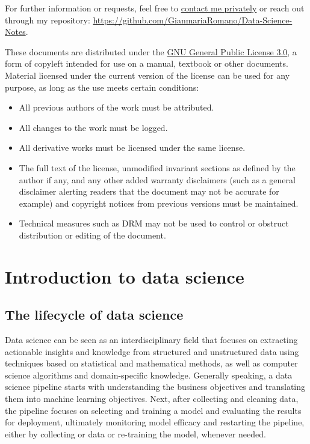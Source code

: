 \documentclass{report}
\begin{document}
\begin{tcolorbox}[colback=gray!5!white, colframe=gray!75!black, title=Contacts]
    For further information or requests, feel free to \href{https://t.me/toritosenso}{contact me privately} or reach out through my repository: \href{https://github.com/GianmariaRomano/Data-Science-Notes}{https://github.com/GianmariaRomano/Data-Science-Notes}.
\end{tcolorbox}

\begin{tcolorbox}[colback=gray!5!white, colframe=gray!75!black, title=License]
    These documents are distributed under the \href{https://www.gnu.org/licenses/gpl-3.0.en.html}{GNU General Public License 3.0}, a form of copyleft intended for use on a manual, textbook or other documents. Material licensed under the current version of the license can be used for any purpose, as long as the use meets certain conditions:
    \begin{itemize}
        \item All previous authors of the work must be attributed.
        \item All changes to the work must be logged.
        \item All derivative works must be licensed under the same license.
        \item The full text of the license, unmodified invariant sections as defined by the author if any, and any other added warranty disclaimers (such as a general disclaimer alerting readers that the document may not be accurate for example) and copyright notices from previous versions must be maintained.
        \item Technical measures such as DRM may not be used to control or obstruct distribution or editing of the document.
    \end{itemize}
\end{tcolorbox}

\tableofcontents

\chapter{Introduction to data science}
\section{The lifecycle of data science}
Data science can be seen as an interdisciplinary field that focuses on extracting actionable insights and knowledge from structured and unstructured data using techniques based on statistical and mathematical methods, as well as computer science algorithms and domain-specific knowledge. \newline
Generally speaking, a data science pipeline starts with understanding the business objectives and translating them into machine learning objectives. \newline
Next, after collecting and cleaning data, the pipeline focuses on selecting and training a model and evaluating the results for deployment, ultimately monitoring model efficacy and restarting the pipeline, either by collecting or data or re-training the model, whenever needed.
\end{document}
